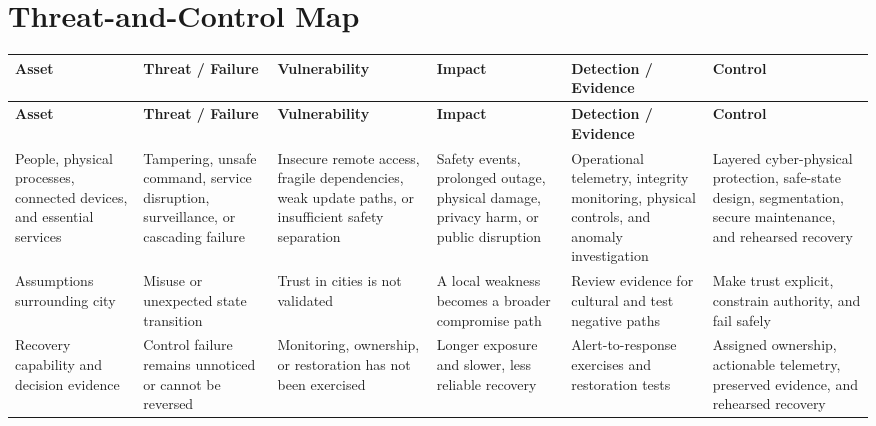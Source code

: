 \documentclass[11pt,letterpaper]{article}
\begin{document}
\section*{Threat-and-Control Map}
\begingroup\scriptsize\setlength{\tabcolsep}{2pt}
\begin{longtable}{>{\raggedright\arraybackslash}p{}>{\raggedright\arraybackslash}p{}>{\raggedright\arraybackslash}p{}>{\raggedright\arraybackslash}p{}>{\raggedright\arraybackslash}p{}>{\raggedright\arraybackslash}p{}}
\toprule\rowcolor{Navy}\color{white}\textbf{Asset} & \color{white}\textbf{Threat / Failure} & \color{white}\textbf{Vulnerability} & \color{white}\textbf{Impact} & \color{white}\textbf{Detection / Evidence} & \color{white}\textbf{Control}\\\midrule
\endfirsthead
\toprule\rowcolor{Navy}\color{white}\textbf{Asset} & \color{white}\textbf{Threat / Failure} & \color{white}\textbf{Vulnerability} & \color{white}\textbf{Impact} & \color{white}\textbf{Detection / Evidence} & \color{white}\textbf{Control}\\\midrule
\endhead
People, physical processes, connected devices, and essential services & Tampering, unsafe command, service disruption, surveillance, or cascading failure & Insecure remote access, fragile dependencies, weak update paths, or insufficient safety separation & Safety events, prolonged outage, physical damage, privacy harm, or public disruption & Operational telemetry, integrity monitoring, physical controls, and anomaly investigation & Layered cyber-physical protection, safe-state design, segmentation, secure maintenance, and rehearsed recovery\\\midrule
Assumptions surrounding city & Misuse or unexpected state transition & Trust in cities is not validated & A local weakness becomes a broader compromise path & Review evidence for cultural and test negative paths & Make trust explicit, constrain authority, and fail safely\\\midrule
Recovery capability and decision evidence & Control failure remains unnoticed or cannot be reversed & Monitoring, ownership, or restoration has not been exercised & Longer exposure and slower, less reliable recovery & Alert-to-response exercises and restoration tests & Assigned ownership, actionable telemetry, preserved evidence, and rehearsed recovery\\\midrule
\bottomrule
\end{longtable}
\endgroup
\end{document}
